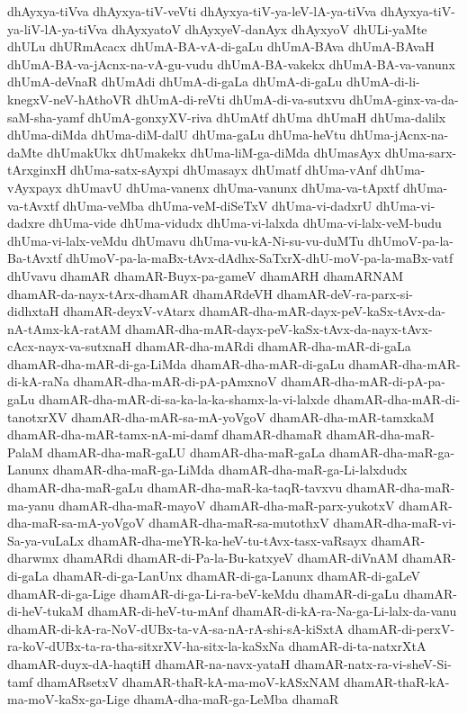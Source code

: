 {dhAyxya-tiVva
dhAyxya-tiV-veVti
dhAyxya-tiV-ya-leV-lA-ya-tiVva
dhAyxya-tiV-ya-liV-lA-ya-tiVva
dhAyxyatoV
dhAyxyeV-danAyx
dhAyxyoV
dhULi-yaMte
dhULu
dhURmAcacx
dhUmA-BA-vA-di-gaLu
dhUmA-BAva
dhUmA-BAvaH
dhUmA-BA-va-jAcnx-na-vA-gu-vudu
dhUmA-BA-vakekx
dhUmA-BA-va-vanunx
dhUmA-deVnaR
dhUmAdi
dhUmA-di-gaLa
dhUmA-di-gaLu
dhUmA-di-li-knegxV-neV-hAthoVR
dhUmA-di-reVti
dhUmA-di-va-sutxvu
dhUmA-ginx-va-da-saM-sha-yamf
dhUmA-gonxyXV-riva
dhUmAtf
dhUma
dhUmaH
dhUma-dalilx
dhUma-diMda
dhUma-diM-dalU
dhUma-gaLu
dhUma-heVtu
dhUma-jAcnx-na-daMte
dhUmakUkx
dhUmakekx
dhUma-liM-ga-diMda
dhUmasAyx
dhUma-sarx-tArxginxH
dhUma-satx-sAyxpi
dhUmasayx
dhUmatf
dhUma-vAnf
dhUma-vAyxpayx
dhUmavU
dhUma-vanenx
dhUma-vanunx
dhUma-va-tApxtf
dhUma-va-tAvxtf
dhUma-veMba
dhUma-veM-diSeTxV
dhUma-vi-dadxrU
dhUma-vi-dadxre
dhUma-vide
dhUma-vidudx
dhUma-vi-lalxda
dhUma-vi-lalx-veM-budu
dhUma-vi-lalx-veMdu
dhUmavu
dhUma-vu-kA-Ni-su-vu-duMTu
dhUmoV-pa-la-Ba-tAvxtf
dhUmoV-pa-la-maBx-tAvx-dAdhx-SaTxrX-dhU-moV-pa-la-maBx-vatf
dhUvavu
dhamAR
dhamAR-Buyx-pa-gameV
dhamARH
dhamARNAM
dhamAR-da-nayx-tArx-dhamAR
dhamARdeVH
dhamAR-deV-ra-parx-si-didhxtaH
dhamAR-deyxV-vAtarx
dhamAR-dha-mAR-dayx-peV-kaSx-tAvx-da-nA-tAmx-kA-ratAM
dhamAR-dha-mAR-dayx-peV-kaSx-tAvx-da-nayx-tAvx-cAcx-nayx-va-sutxnaH
dhamAR-dha-mARdi
dhamAR-dha-mAR-di-gaLa
dhamAR-dha-mAR-di-ga-LiMda
dhamAR-dha-mAR-di-gaLu
dhamAR-dha-mAR-di-kA-raNa
dhamAR-dha-mAR-di-pA-pAmxnoV
dhamAR-dha-mAR-di-pA-pa-gaLu
dhamAR-dha-mAR-di-sa-ka-la-ka-shamx-la-vi-lalxde
dhamAR-dha-mAR-di-tanotxrXV
dhamAR-dha-mAR-sa-mA-yoVgoV
dhamAR-dha-mAR-tamxkaM
dhamAR-dha-mAR-tamx-nA-mi-damf
dhamAR-dhamaR
dhamAR-dha-maR-PalaM
dhamAR-dha-maR-gaLU
dhamAR-dha-maR-gaLa
dhamAR-dha-maR-ga-Lanunx
dhamAR-dha-maR-ga-LiMda
dhamAR-dha-maR-ga-Li-lalxdudx
dhamAR-dha-maR-gaLu
dhamAR-dha-maR-ka-taqR-tavxvu
dhamAR-dha-maR-ma-yanu
dhamAR-dha-maR-mayoV
dhamAR-dha-maR-parx-yukotxV
dhamAR-dha-maR-sa-mA-yoVgoV
dhamAR-dha-maR-sa-mutothxV
dhamAR-dha-maR-vi-Sa-ya-vuLaLx
dhamAR-dha-meYR-ka-heV-tu-tAvx-tasx-vaRsayx
dhamAR-dharwmx
dhamARdi
dhamAR-di-Pa-la-Bu-katxyeV
dhamAR-diVnAM
dhamAR-di-gaLa
dhamAR-di-ga-LanUnx
dhamAR-di-ga-Lanunx
dhamAR-di-gaLeV
dhamAR-di-ga-Lige
dhamAR-di-ga-Li-ra-beV-keMdu
dhamAR-di-gaLu
dhamAR-di-heV-tukaM
dhamAR-di-heV-tu-mAnf
dhamAR-di-kA-ra-Na-ga-Li-lalx-da-vanu
dhamAR-di-kA-ra-NoV-dUBx-ta-vA-sa-nA-rA-shi-sA-kiSxtA
dhamAR-di-perxV-ra-koV-dUBx-ta-ra-tha-sitxrXV-ha-sitx-la-kaSxNa
dhamAR-di-ta-natxrXtA
dhamAR-duyx-dA-haqtiH
dhamAR-na-navx-yataH
dhamAR-natx-ra-vi-sheV-Si-tamf
dhamARsetxV
dhamAR-thaR-kA-ma-moV-kASxNAM
dhamAR-thaR-kA-ma-moV-kaSx-ga-Lige
dhamA-dha-maR-ga-LeMba
dhamaR
}
